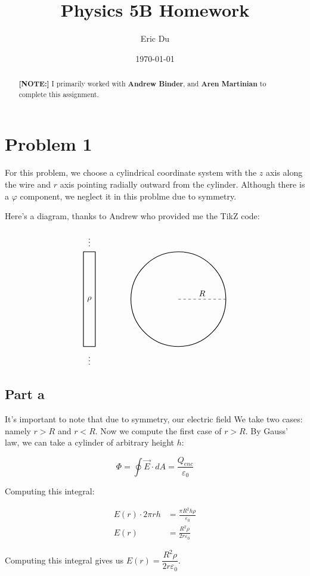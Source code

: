 \documentclass{article}
\title{Physics 5B Homework}
\author{Eric Du}
\date{\today}
\theoremstyle{definition}
\numberwithin{equation}{section}
\numberwithin{definition}{section}
\begin{document}
    \maketitle
    
    \begin{abstract}
        \noindent \textbf{[NOTE:]} I primarily worked with \textbf{Andrew Binder}, and \textbf{Aren Martinian} to complete this assignment.
    \end{abstract}


    \section{Problem 1}
    For this problem, we choose a cylindrical coordinate system with the $z$ axis along the wire and $r$ axis pointing radially outward from the cylinder. Although there is a $\varphi$ component, we neglect it in this problme due to symmetry. 

    \medskip


    Here's a diagram, thanks to Andrew who provided me the TikZ code:

    $$\begin{tikzpicture}
        \draw[thick] (0,0) -- (0,4) -- (0.5,4) -- (0.5,0) -- cycle;
        \node at (0.25,-0.5) (d) {$\vdots$};
        \node at (0.25, 4.5) (s) {$\vdots$};
        \draw[thick] (4,2) circle (2cm);
        \draw[dashed] (4,2) -- (6,2) node[midway, above] {$R$};
        \node at (0.25, 2) (p) {$\rho$};
        \end{tikzpicture}$$
    
    \subsection{Part a}
    It's important to note that due to symmetry, our electric field 
    We take two cases: namely $r > R$ and $r < R$. Now we compute the first case of $r > R$. By Gauss' law, we can take a cylinder of arbitrary height $h$:

    \[ \Phi = \oint \vec E \cdot dA = \frac{Q_{enc}}{\varepsilon_0} \] 

    Computing this integral: 

    \begin{align*}
        E(r) \cdot 2 \pi r h &= \frac{\pi R^2 h \rho}{\varepsilon_0}\\
        E(r) &= \frac{R^2\rho}{2r\varepsilon_0}
    \end{align*}

    Computing this integral gives us $E(r) = \dfrac{R^2\rho}{2r\varepsilon_0}$.
\end{document}
